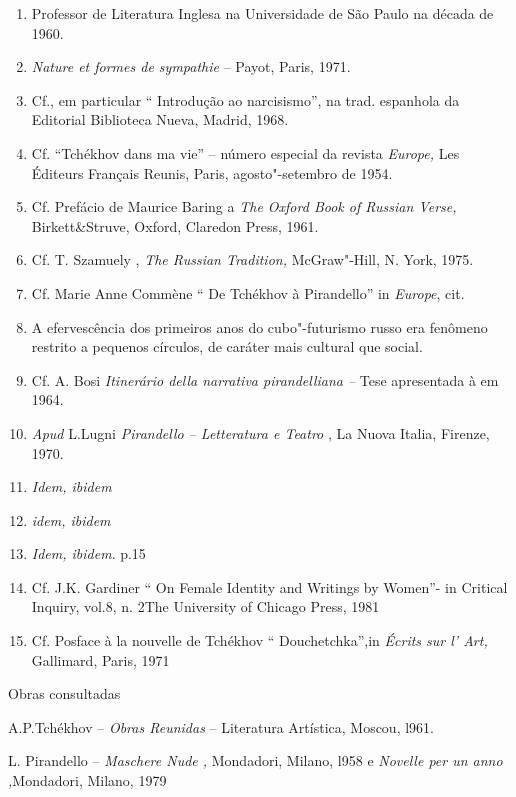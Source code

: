 \begin{enumerate}
\def\labelenumi{\arabic{enumi}.}
\item
  Professor de Literatura Inglesa na Universidade de São Paulo na década
  de 1960.
\item
  \emph{Nature et formes de sympathie} -- Payot, Paris, 1971.
\item
  Cf., em particular `` Introdução ao narcisismo'', na trad. espanhola
  da Editorial Biblioteca Nueva, Madrid, 1968.
\item
  Cf. ``Tchékhov dans ma vie'' -- número especial da revista
  \emph{Europe,} Les Éditeurs Français Reunis, Paris, agosto"-setembro de
  1954.
\item
  Cf. Prefácio de Maurice Baring a \emph{The Oxford Book of Russian
  Verse,} Birkett\&Struve, Oxford, Claredon Press, 1961.
\item
  Cf. T. Szamuely , \emph{The Russian Tradition,} McGraw"-Hill, N. York,
  1975.
\item
  Cf. Marie Anne Commène `` De Tchékhov à Pirandello'' in \emph{Europe},
  cit.
\item
  A efervescência dos primeiros anos do cubo"-futurismo russo era
  fenômeno restrito a pequenos círculos, de caráter mais cultural que
  social.
\item
  Cf. A. Bosi \emph{Itinerário della narrativa pirandelliana --} Tese
  apresentada à  em 1964.
\item
  \emph{Apud} L.Lugni \emph{Pirandello -- Letteratura e Teatro} , La
  Nuova Italia, Firenze, 1970.
\item
  \emph{Idem, ibidem}
\item
  \emph{idem, ibidem}
\item
  \emph{Idem, ibidem}. p.15
\item
  Cf. J.K. Gardiner `` On Female Identity and Writings by Women''- in
  Critical Inquiry, vol.8, n. 2The \textbar{}University of Chicago
  Press, 1981
\item
  Cf. Posface à la nouvelle de Tchékhov `` Douchetchka'',in \emph{Écrits
  sur l' Art,} Gallimard, Paris, 1971
\end{enumerate}

Obras consultadas

A.P.Tchékhov -- \emph{Obras Reunidas} -- Literatura Artística, Moscou,
l961.

L. Pirandello -- \emph{Maschere Nude ,} Mondadori, Milano, l958 e
\emph{Novelle per un anno ,}Mondadori, Milano, 1979

